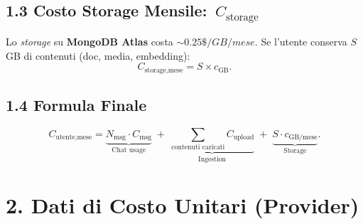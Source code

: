 \documentclass[a4paper,10pt]{article}
\begin{document}
\subsection*{1.3 Costo Storage Mensile: \(\,C_{\text{storage}}\)}

Lo \emph{storage} su \textbf{MongoDB Atlas} costa \(\sim0.25\$/GB/mese\). Se l’utente conserva \(S\) GB di contenuti (doc, media, embedding):
\[
C_{\text{storage,mese}} = S \times c_{\text{GB}}.
\]

\subsection*{1.4 Formula Finale}

\[
\boxed{
C_{\text{utente,mese}}
=
\underbrace{N_{\text{msg}} \cdot C_{\text{msg}}}_{\text{Chat usage}}
\;+\;
\underbrace{\sum_{\text{contenuti caricati}} C_{\text{upload}}}_{\text{Ingestion}}
\;+\;
\underbrace{S \cdot c_{\text{GB/mese}}}_{\text{Storage}}.
}
\]

\section*{2. Dati di Costo Unitari (Provider)}
\end{document}
